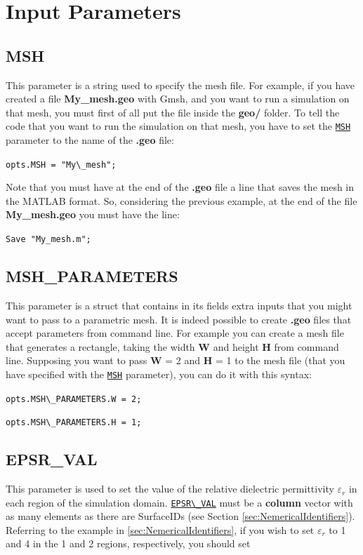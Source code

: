 \documentclass[12pt,a4paper]{article}
\newcommand{\matlabs}[1]{{\lstinline[style=MatlabStyle]!#1!}}
\newcommand{\seclink}[2]{%
	\begingroup
	\hypersetup{linkcolor=orange}%
	\hyperref[sec:#1]{\matlabs{#2}}%
	\endgroup
}
\begin{document}
	\section{Input Parameters}
	
	\subsection{MSH}
	\label{sec:msh}
	This parameter is a string used to specify the mesh file.
	For example, if you have created a file \textbf{My\_mesh.geo} with Gmsh, and you want to run a simulation on that mesh, you must first of all put the file inside the \textbf{geo/} folder.
	To tell the code that you want to run the simulation on that mesh, you have to set the \seclink{msh}{MSH} parameter to the name of the \textbf{.geo} file:
	
	\matlabs{opts.MSH = "My\_mesh";}
	
	\noindent Note that you must have at the end of the \textbf{.geo} file a line that saves the mesh in the MATLAB format. So, considering the previous example, at the end of the file \textbf{My\_mesh.geo} you must have the line: 
	
	{\small \texttt{Save "My\_mesh.m";}}
	
	\subsection{MSH\_PARAMETERS}
	\label{sec:mshparam}
	This parameter is a struct that contains in its fields extra inputs that you might want to pass to a parametric mesh.
	It is indeed possible to create \textbf{.geo} files that accept parameters from command line. 
	For example you can create a mesh file that generates a rectangle, taking the width \textbf{W} and height \textbf{H} from command line.
	Supposing you want to pass \textbf{W} = 2 and \textbf{H} = 1 to the mesh file (that you have specified with the \seclink{msh}{MSH} parameter), you can do it with this syntax:
	
	\matlabs{opts.MSH\_PARAMETERS.W = 2;}
	
	\matlabs{opts.MSH\_PARAMETERS.H = 1;}
	
	\subsection{EPSR\_VAL}
	\label{sec:epsrval}
	This parameter is used to set the value of the relative dielectric permittivity $\varepsilon_r$ in each region of the simulation domain. \seclink{epsrval}{EPSR\_VAL} must be a \textbf{column} vector with as many elements as there are SurfaceIDs (see Section \ref{sec:NemericalIdentifiers}). Referring to the example in \ref{sec:NemericalIdentifiers}, if you wish to set $\varepsilon_r$ to 1 and 4 in the \colorbox{aircolor}{1} and \colorbox{dielcolor}{2} regions, respectively, you should set
	
\end{document}
